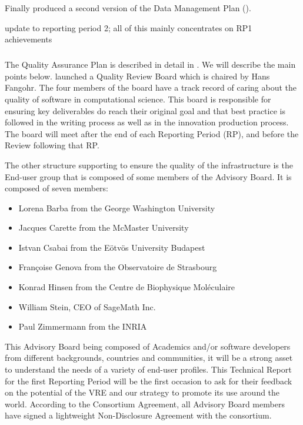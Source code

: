 Finally  produced a second version of the Data Management
Plan ().


\begin{oldpart}{update to reporting period 2; all of this mainly concentrates on RP1 achievements}
\subparagraph{}


The Quality Assurance Plan is described in detail in
. We will describe the main points
below.   launched a Quality Review Board which is chaired by
Hans Fangohr. The four members of the board have a track record of
caring about the quality of software in computational science. This
board is responsible for ensuring key deliverables do reach their
original goal and that best practice is followed in the writing
process as well as in the innovation production process.  The board
will meet after the end of each Reporting Period (RP), and before the
Review following that RP.

The other structure supporting \ODK to ensure the quality of the
infrastructure is the End-user group that is composed of some members
of the Advisory Board. It is composed of seven members:

\begin{itemize}
\item{Lorena Barba from the George Washington University}
\item{Jacques Carette from the McMaster University}
\item{Istvan Csabai from the Eötvös University Budapest}
\item{Françoise Genova from the Observatoire de Strasbourg}
\item{Konrad Hinsen from the Centre de Biophysique Moléculaire}
\item{William Stein, CEO of SageMath Inc.}
\item{Paul Zimmermann from the INRIA}
\end{itemize}

This Advisory Board being composed of Academics and/or software
developers from different backgrounds, countries and communities, it
will be a strong asset to understand the needs of a variety of
end-user profiles. This Technical Report for the first Reporting
Period will be the first occasion to ask for their feedback on the
potential of the VRE and our strategy to promote its use around the
world. According to the Consortium Agreement, all Advisory Board
members have signed a lightweight Non-Disclosure Agreement with the
consortium.


\end{oldpart}

